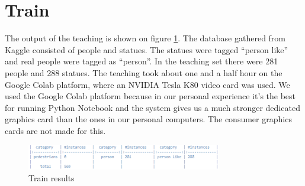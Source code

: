 \section{Train}
The output of the teaching is shown on figure \ref{fig:train}. The database gathered from Kaggle consisted of people and statues. The statues were tagged “person like” and real people were tagged as “person”. In the teaching set there were 281 people and 288 statues. The teaching took about one and a half hour on the Google Colab platform, where an NVIDIA Tesla K80 video card was used. We used the Google Colab platform because in our personal experience it’s the best for running Python Notebook and the system gives us a much stronger dedicated graphics card than the ones in our personal computers. The consumer graphics cards are not made for this.


\begin{figure}[!ht]
\centering
\includegraphics[width=85mm,keepaspectratio]{fig/train.png}
\caption{Train results}
\label{fig:train} 
\end{figure}

